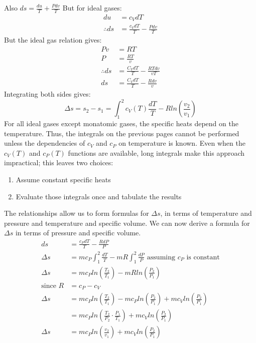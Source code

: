\documentclass[class=report, crop=false, 12pt,a4paper]{standalone}
\begin{document}
Also \( ds = \frac{du}{T} + \frac{Pdv}{T} \)
But for ideal gases:
\begin{align*}
  du &= c_V dT\\
  \therefore ds &= \frac{c_VdT}{T} - \frac{Pdv}{T}
\end{align*}
But the ideal gas relation gives:
\begin{align*}
  Pv&=RT\\
  P&=\frac{RT}{v}\\
  \therefore ds &= \frac{C_VdT}{T} - \frac{RTdv}{vT}\\
  ds &= \frac{C_VdT}{T} - \frac{Rdv}{v}
\end{align*}
Integrating both sides gives:
\[ \Delta s = s_2 - s_1 = \int_1^2 c_V(T)\frac{dT}{T} - Rln\left(\frac{v_2}{v_1}\right) \]
For all ideal gases except monatomic gases, the specific heats depend on the temperature. Thus, the integrals on the previous pages cannot be performed unless the dependencies of \(c_V\) and \(c_P\) on temperature is known. Even when the \(c_V(T)\) and \(c_P(T)\) functions are available, long integrals make this approach impractical; this leaves two choices:
\begin{enumerate}[noitemsep]
  \item Assume constant specific heats
  \item Evaluate those integrals once and tabulate the results
\end{enumerate}
The relationships allow us to form formulas for \(\Delta s\), in terms of temperature and pressure and temperature and specific volume. We can now derive a formula for \(\Delta s\) in terms of pressure and specific volume.
\begin{align*}
  ds &= \frac{c_PdT}{T} - \frac{RdP}{P}\\
  \Delta s &= mc_P \int_1^2 \frac{dT}{T} - mR \int_1^2 \frac{dP}{P} \textrm{ assuming \(c_P\) is constant}\\ 
  \Delta s &= mc_P ln \left( \frac{T_2}{T_1} \right) - mRln \left( \frac{P_2}{P_1} \right)\\
  \textrm{since } R &= c_P - c_V\\
  \Delta s &= mc_P ln \left( \frac{T_2}{T_1} \right) - mc_P ln \left( \frac{P_2}{P_1} \right) + mc_V ln \left( \frac{P_2}{P_1} \right)\\
  &= mc_P ln \left(\frac{T_2}{P_2} \cdot \frac{P_1}{T_1} \right) + mc_V ln \left( \frac{P_2}{P_1} \right)\\
  \Delta s &= mc_P ln \left( \frac{v_2}{v_1} \right) + mc_Vln\left( \frac{P_2}{P_1} \right)
\end{align*}
\end{document}
